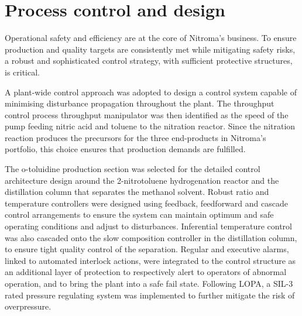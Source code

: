 \section*{Process control and design}

Operational safety and efficiency are at the core of Nitroma's business. To ensure production and quality targets are consistently met while mitigating safety risks, a robust and sophisticated control strategy, with sufficient protective structures, is critical.

A plant-wide control approach was adopted to design a control system capable of minimising disturbance propagation throughout the plant.  The throughput control  process throughput manipulator was then identified as the speed of the pump feeding nitric acid and toluene to the nitration reactor. Since the nitration reaction produces the precursors for the three end-products in Nitroma's portfolio, this choice ensures that production demands are fulfilled.   


The o-toluidine production section was selected for the detailed control architecture design around the 2-nitrotoluene hydrogenation reactor and the distillation column that separates the methanol solvent. Robust ratio and temperature controllers were designed using feedback, feedforward and cascade control arrangements to ensure the system can maintain optimum and safe operating conditions and adjust to disturbances. Inferential temperature control was also cascaded onto the slow composition controller in the distillation column, to ensure tight quality control of the separation. 
Regular and executive alarms, linked to automated interlock actions, were integrated to the control structure as an additional layer of protection to respectively alert to operators of abnormal operation, and to bring the plant into a safe fail state. Following LOPA, a SIL-3 rated pressure regulating system was implemented to further mitigate the risk of overpressure.




